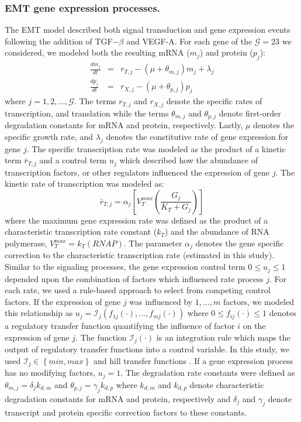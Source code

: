 \documentclass[11pt,letterpaper]{article}
\begin{document}
\subsubsection*{EMT gene expression processes.}
The EMT model described both signal transduction and gene expression events following the addition of TGF$-\beta$ and VEGF-A.
For each gene of the $\mathcal{G}=23$ we considered, we modeled both the resulting mRNA ($m_{j}$) and protein ($p_{j}$):
\begin{eqnarray}
	\frac{dm_{j}}{dt} &=& r_{T,j} - \left(\mu+\theta_{m,j}\right)m_{j}+\lambda_{j}\\
	\frac{dp_{j}}{dt} &=& r_{X,j} - \left(\mu+\theta_{p,j}\right)p_{j}
\end{eqnarray}where $j=1,2,\dots,\mathcal{G}$.
The terms $r_{T,j}$ and $r_{X,j}$ denote the specific rates of transcription, and translation while
the terms $\theta_{m,j}$ and $\theta_{p,j}$ denote first-order degradation constants for mRNA and protein, respectively.
Lastly, $\mu$ denotes the specific growth rate, and $\lambda_{j}$ denotes the constitutive rate of gene expression for gene $j$.
The specific transcription rate was modeled as the product of a kinetic term $\bar{r}_{T,j}$ and a control term $u_{j}$ which described how the
abundance of transcription factors, or other regulators influenced the expression of gene $j$.
The kinetic rate of transcription was modeled as:
\begin{equation}
	\bar{r}_{T,j} = \alpha_{j}\left[V^{max}_{T}\left(\frac{G_{j}}{K_{T}+G_{j}}\right)\right]
\end{equation}where the maximum gene expression rate was defined as the product of a characteristic transcription rate constant ($k_{T}$)
and the abundance of RNA polymerase, $V^{max}_{T} = k_{T}\left(RNAP\right)$.
The parameter $\alpha_{j}$ denotes the gene specific correction to the characteristic transcription rate (estimated in this study).
Similar to the signaling processes, the gene expression control term $0\leq u_{j}\leq 1$ depended upon the combination of factors which influenced rate process $j$.
For each rate, we used a rule-based approach to select from competing control factors.
If the expression of gene $j$ was influenced by $1,\dots,m$ factors, we modeled this relationship as
$u_{j}=\mathcal{I}_{j}\left(f_{1j}\left(\cdot\right),\hdots,f_{mj}\left(\cdot\right)\right)$
where $0\leq f_{ij}\left(\cdot\right)\leq 1$ denotes a regulatory transfer function quantifying the influence of factor $i$ on the expression of gene $j$.
The function $\mathcal{I}_{j}\left(\cdot\right)$ is an integration rule which maps the output of regulatory transfer functions into a control
variable. In this study, we used $\mathcal{I}_{j}\in\left\{min,max\right\}$ and hill transfer functions \cite{pr3010178,pr3010138}.
If a gene expression process has no modifying factors, $u_{j}=1$.
The degradation rate constants were defined as $\theta_{m,j} = \delta_{j}k_{d,m}$ and $\theta_{p,j} = \gamma_{j}k_{d,p}$
where $k_{d,m}$ and $k_{d,p}$ denote characteristic degradation constants for mRNA and protein, respectively and $\delta_{j}$ and $\gamma_{j}$ denote transcript and protein specific
correction factors to these constants.
\end{document}
